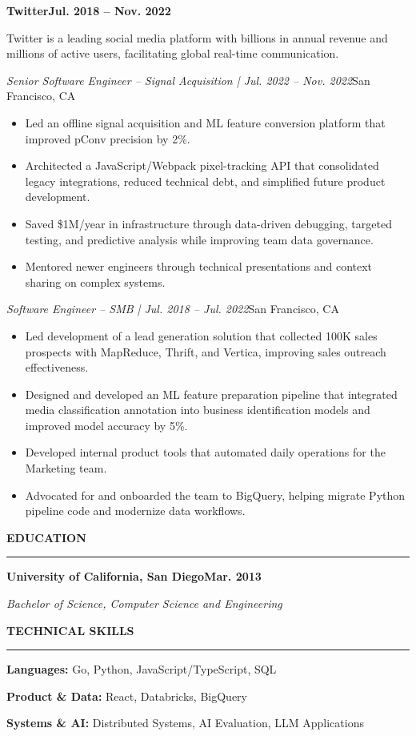 \documentclass[10pt,letterpaper]{article}
\newcommand{\resumesection}[1]{
  \vspace{10pt}
  {\normalsize\bfseries\MakeUppercase{#1}\par}
  \vspace{3pt}
  \hrule
  \vspace{7pt}
}
\newcommand{\companyheading}[2]{
  \noindent\textbf{#1}\hfill\textbf{#2}\par
}
\newcommand{\roleheading}[2]{
  \noindent\textit{#1}\hfill #2\par
}
\newcommand{\companysummary}[1]{
  {\small #1\par}
  \vspace{2pt}
}
\newcommand{\entryspace}{
  \vspace{6pt}
}
\begin{document}
\companyheading{Twitter}{Jul. 2018 -- Nov. 2022}
\companysummary{Twitter is a leading social media platform with billions in annual revenue and millions of active users, facilitating global real-time communication.}

\roleheading{Senior Software Engineer -- Signal Acquisition | Jul. 2022 -- Nov. 2022}{San Francisco, CA}
\begin{itemize}\small
  \item Led an offline signal acquisition and ML feature conversion platform that improved pConv precision by 2\%.
  \item Architected a JavaScript/Webpack pixel-tracking API that consolidated legacy integrations, reduced technical debt, and simplified future product development.
  \item Saved \$1M/year in infrastructure through data-driven debugging, targeted testing, and predictive analysis while improving team data governance.
  \item Mentored newer engineers through technical presentations and context sharing on complex systems.
\end{itemize}
\entryspace
\normalsize

\roleheading{Software Engineer -- SMB | Jul. 2018 -- Jul. 2022}{San Francisco, CA}
\begin{itemize}\small
  \item Led development of a lead generation solution that collected 100K sales prospects with MapReduce, Thrift, and Vertica, improving sales outreach effectiveness.
  \item Designed and developed an ML feature preparation pipeline that integrated media classification annotation into business identification models and improved model accuracy by 5\%.
  \item Developed internal product tools that automated daily operations for the Marketing team.
  \item Advocated for and onboarded the team to BigQuery, helping migrate Python pipeline code and modernize data workflows.
\end{itemize}
\entryspace
\normalsize

\resumesection{Education}
\companyheading{University of California, San Diego}{Mar. 2013}
\textit{Bachelor of Science, Computer Science and Engineering}\par

\resumesection{Technical Skills}
{\small
\textbf{Languages:} Go, Python, JavaScript/TypeScript, SQL \par
\textbf{Product \& Data:} React, Databricks, BigQuery \par
\textbf{Systems \& AI:} Distributed Systems, AI Evaluation, LLM Applications \par
}
\end{document}
